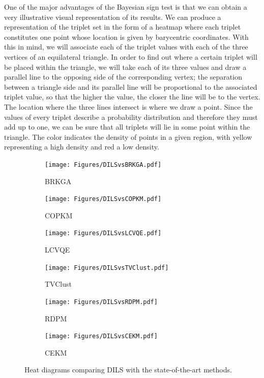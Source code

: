 \documentclass[review]{elsarticle}
\begin{document}
One of the major advantages of the Bayesian sign test is that we can obtain a very illustrative visual representation of its results. We can produce a representation of the triplet set in the form of a heatmap where each triplet constitutes one point whose location is given by barycentric coordinates. With this in mind, we will associate each of the triplet values with each of the three vertices of an equilateral triangle. In order to find out where a certain triplet will be placed within the triangle, we will take each of its three values and draw a parallel line to the opposing side of the corresponding vertex; the separation between a triangle side and its parallel line will be proportional to the associated triplet value, so that the higher the value, the closer the line will be to the vertex. The location where the three lines intersect is where we draw a point. Since the values of every triplet describe a probability distribution and therefore they must add up to one, we can be sure that all triplets will lie in some point within the triangle. The color indicates the density of points in a given region, with yellow representing a high density and red a low density.

\begin{figure}[ht!]
	\centering
	\begin{subfigure}{.45\textwidth}
		\texttt{[image: Figures/DILSvsBRKGA.pdf]}
		\caption{BRKGA}
		\label{fig:DILSvsBRKGA}
	\end{subfigure}
	\begin{subfigure}{.45\textwidth}
		\texttt{[image: Figures/DILSvsCOPKM.pdf]}
		\caption{COPKM}
		\label{fig:DILSvsCOPKM}
	\end{subfigure}
	\begin{subfigure}{.45\textwidth}
		\texttt{[image: Figures/DILSvsLCVQE.pdf]}
		\caption{LCVQE}
		\label{fig:DILSvsLCVQE}
	\end{subfigure}
	\begin{subfigure}{.45\textwidth}
		\texttt{[image: Figures/DILSvsTVClust.pdf]}
		\caption{TVClust}
		\label{fig:DILSvsTVClust}
	\end{subfigure}
	\begin{subfigure}{.45\textwidth}
		\texttt{[image: Figures/DILSvsRDPM.pdf]}
		\caption{RDPM}
		\label{fig:DILSvsRDPM}
	\end{subfigure}
	\begin{subfigure}{.45\textwidth}
		\texttt{[image: Figures/DILSvsCEKM.pdf]}
		\caption{CEKM}
		\label{fig:DILSvsCEKM}
	\end{subfigure}
	\caption{Heat diagrams comparing DILS with the state-of-the-art methods.}
	\label{fig:heatDiag}
\end{figure}
\end{document}
